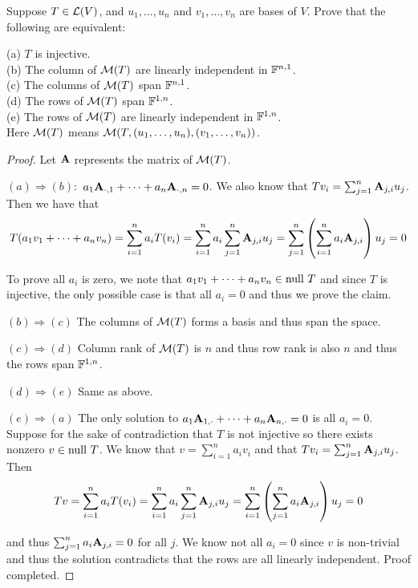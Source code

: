 \documentclass{extarticle}
\begin{document}
\begin{problem}{17}
    Suppose \(T \in \mathcal{L}(V)\), and \(u_1, \ldots, u_n\) and \(v_1, \ldots, v_n\) are bases of \(V\). 
    Prove that the following are equivalent:

    (a) \(T\) is injective. \\ 
    (b) The column of \(\mathcal{M}(T)\) are linearly independent in \(\mathbb{F}^{n, 1}\). \\ 
    (c) The columns of \(\mathcal{M}(T)\) span \(\mathbb{F}^{n, 1}\). \\ 
    (d) The rows of \(\mathcal{M}(T)\) span \(\mathbb{F}^{1 , n}\). \\ 
    (e) The rows of \(\mathcal{M}(T)\) are linearly independent in \(\mathbb{F}^{1, n}\). \\ 
    Here \(\mathcal{M}(T)\) means \(\mathcal{M}(T, (u_1, \ldots, u_n), (v_1, \ldots, v_n))\). 
\end{problem}

\begin{proof}
    Let \(\mathbf{A}\) represents the matrix of \(\mathcal{M}(T)\). 

\((a) \Rightarrow (b) \colon\) \(a_1 \mathbf{A}_{\cdot, 1} + \cdots + a_n \mathbf{A}_{\cdot, n} = 0 \). We also 
know that \(T v_i = \sum_{j=1}^{n}\mathbf{A}_{j, i} u_j\). Then we have that 
\[T(a_1 v_1 + \cdots + a_n v_n) = \sum_{i=1}^{n} a_i T(v_i) = \sum_{i=1}^{n}a_i \sum_{j=1}^{n}\mathbf{A}_{j, i} u_j 
= \sum_{j=1}^{n} \left(\sum_{i=1}^n a_i \mathbf{A}_{j, i} \right) u_j = 0 \]

To prove all \(a_i\) is zero, 
we note that \(a_1 v_1 + \cdots + a_n v_n \in \text{null } T\) and since \(T\) is injective, the only possible case 
is that all \(a_i = 0\) and thus we prove the claim. 

\((b) \Rightarrow (c)\) The columns of \(\mathcal{M}(T)\) forms a basis and thus span the space. 

\((c) \Rightarrow (d)\) Column rank of \(\mathcal{M}(T)\) is \(n\) and thus row rank is also \(n\) and thus the rows 
span \(\mathbb{F}^{1, n}\). 

\((d) \Rightarrow (e)\) Same as above. 

\((e) \Rightarrow (a)\) The only solution to \(a_1 \mathbf{A}_{1, \cdot} + \cdots + a_n \mathbf{A}_{n, \cdot} = 0\) is all 
\(a_i = 0\). Suppose for the sake of contradiction that \(T\) is not injective so there exists nonzero 
\( v \in \text{null } T\). We know that \(v = \sum_{i=1}^{n} a_i v_i\) and that \(T v_i = \sum_{j=1}^{n} \mathbf{A}_{j, i} u_j\). Then 
\[T v = \sum_{i=1}^{n} a_i T(v_i) = \sum_{i=1}^{n} a_i \sum_{j=1}^{n} \mathbf{A}_{j, i} u_j = \sum_{i=1}^{n}
\left(\sum_{j=1}^{n} a_i \mathbf{A}_{j, i} \right) u_j = 0 \]

and thus \(\sum_{j=1}^{n} a_i \mathbf{A}_{j, i} = 0\) for all \(j\). We know not all \(a_i = 0\) since \(v\) is 
non-trivial and thus the solution contradicts that the rows are all linearly independent. Proof completed.
\end{proof}
\end{document}
